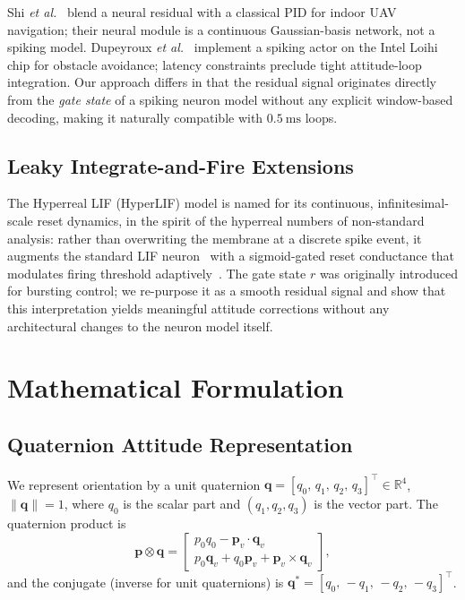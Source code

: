 \documentclass[conference]{IEEEtran}
\begin{document}
Shi \textit{et al.}~\cite{shi2021neural_aug} blend a neural residual with a
classical PID for indoor UAV navigation; their neural module is a continuous
Gaussian-basis network, not a spiking model.
Dupeyroux \textit{et al.}~\cite{dupeyroux2021neuromorphic} implement a spiking
actor on the Intel Loihi chip for obstacle avoidance; latency constraints
preclude tight attitude-loop integration.
Our approach differs in that the residual signal originates directly from the
\emph{gate state} of a spiking neuron model without any explicit window-based
decoding, making it naturally compatible with $\SI{0.5}{\milli\second}$ loops.

\subsection{Leaky Integrate-and-Fire Extensions}

The Hyperreal LIF (HyperLIF) model is named for its continuous,
infinitesimal-scale reset dynamics, in the spirit of the hyperreal numbers of
non-standard analysis: rather than overwriting the membrane at a discrete spike
event, it augments the standard LIF neuron~\cite{maass1997lsm} with a
sigmoid-gated reset conductance that modulates firing threshold
adaptively~\cite{hyperlif_original}.
The gate state $r$ was originally introduced for bursting control; we
re-purpose it as a smooth residual signal and show that this interpretation
yields meaningful attitude corrections without any architectural changes to the
neuron model itself.

\section{Mathematical Formulation}
\label{sec:formulation}

\subsection{Quaternion Attitude Representation}

We represent orientation by a unit quaternion
$\mathbf{q} = [q_0,\, q_1,\, q_2,\, q_3]^\top \in \mathbb{R}^4$,
$\|\mathbf{q}\| = 1$,
where $q_0$ is the scalar part and $(q_1, q_2, q_3)$ is the vector part.
The quaternion product is
\begin{equation}
  \mathbf{p} \otimes \mathbf{q} =
  \begin{bmatrix}
    p_0 q_0 - \mathbf{p}_v \cdot \mathbf{q}_v \\
    p_0 \mathbf{q}_v + q_0 \mathbf{p}_v + \mathbf{p}_v \times \mathbf{q}_v
  \end{bmatrix},
\end{equation}
and the conjugate (inverse for unit quaternions) is
$\mathbf{q}^* = [q_0,\, -q_1,\, -q_2,\, -q_3]^\top$.
\end{document}
